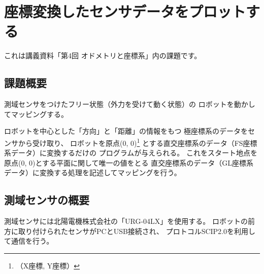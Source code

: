 \documentclass[main]{subfiles}
\begin{document}
\chapter{座標変換したセンサデータをプロットする}

これは講義資料「第4回 オドメトリと座標系」内の課題です。

\section{課題概要}
測域センサをつけたフリー状態（外力を受けて動く状態）の
ロボットを動かしてマッピングする。

ロボットを中心とした「方向」と「距離」の情報をもつ
極座標系のデータをセンサから受け取り、
ロボットを原点(0, 0)\footnote{（X座標, Y座標）}
とする直交座標系のデータ（FS座標系データ）に変換するだけの
プログラムが与えられる。
これをスタート地点を原点(0, 0)とする平面に関して唯一の値をとる
直交座標系のデータ（GL座標系データ）に変換する処理を記述してマッピングを行う。

\section{測域センサの概要}
測域センサには北陽電機株式会社の「URG-04LX」を使用する。
ロボットの前方に取り付けられたセンサがPCとUSB接続され、
プロトコルSCIP2.0を利用して通信を行う。
\end{document}
